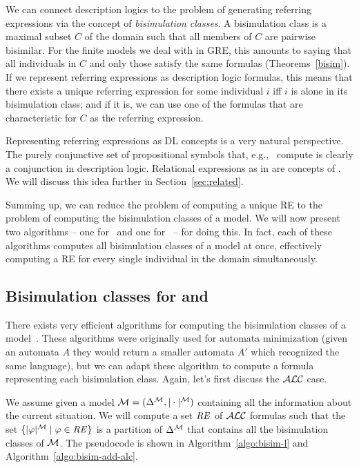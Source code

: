 We can connect description logics to the problem of generating
referring expressions via the concept of \emph{bisimulation classes}.
A bisimulation class is a maximal subset $C$ of the domain such that
all members of $C$ are pairwise bisimilar.  For the finite models we
deal with in GRE, this amounts to saying that all individuals in $C$ and only those satisfy the same formulas (Theorems~\ref{bisim}).  If we represent referring expressions as description logic formulas,
this means that there exists a unique referring expression for some
individual $i$ iff $i$ is alone in its bisimulation class; and if it
is, we can use one of the formulas that are characteristic for $C$ as
the referring expression.

Representing referring expressions as DL concepts is a very natural
perspective.  The purely conjunctive set of propositional symbols that,
e.g.,~ compute is clearly a conjunction in
description logic.  Relational expressions as in
 are concepts of \el.
We will discuss this idea further in Section~\ref{sec:related}.

Summing up, we can reduce the problem of computing a unique RE
to the problem of computing the bisimulation classes of a model.  We
will now present two algorithms -- one for \alc\ and one for \el\ --
for doing this.  In fact, each of these algorithms computes all
bisimulation classes of a model at once, effectively computing a RE
for every single individual in the domain simultaneously.


\subsection{Bisimulation classes for \alc and \el}


There exists very efficient algorithms
for computing the bisimulation classes of a model~\cite{hopc:algo71,paig:thre87,dovier04:_effic_algor_for_comput_bisim_equiv}.
These algorithms were originally used for automata minimization (given an
automata $A$ they would return a smaller automata $A'$ which recognized the
same language), but we can adapt these algorithm to compute a formula representing each bisimulation class.  Again, let's first
discuss the $\mathcal{ALC}$ case.

We assume given a model $\mathcal{M}=(\Delta^{\mathcal{M}}, |\cdot|^{\mathcal{M}})$ containing all the information about the current
situation.  We will compute a set $\mathit{RE}$ of $\mathcal{ALC}$ formulas such that the
set $\{|\varphi|^{\mathcal{M}} \mid \varphi \in \mathit{RE}\}$ is a partition of $\Delta^{\mathcal{M}}$
that contains all the bisimulation classes of $\mathcal{M}$.  The pseudocode is
shown in Algorithm~\ref{algo:bisim-l} and Algorithm~\ref{algo:bisim-add-alc}.


